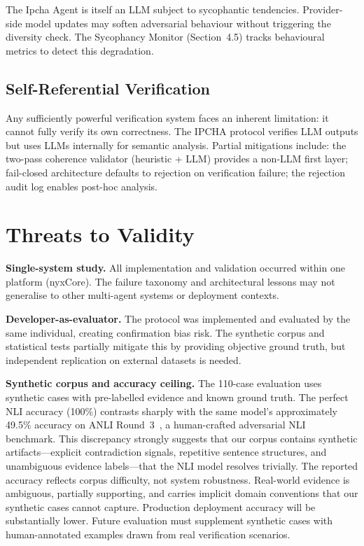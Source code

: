 \documentclass[11pt,a4paper]{article}
\begin{document}
The Ipcha Agent is itself an LLM subject to sycophantic tendencies.
Provider-side model updates may soften adversarial behaviour without
triggering the diversity check.  The Sycophancy Monitor
(Section~4.5) tracks behavioural metrics to detect this degradation.

\subsection{Self-Referential Verification}

Any sufficiently powerful verification system faces an inherent
limitation: it cannot fully verify its own correctness.  The IPCHA
protocol verifies LLM outputs but uses LLMs internally for semantic
analysis.  Partial mitigations include: the two-pass coherence
validator (heuristic + LLM) provides a non-LLM first layer;
fail-closed architecture defaults to rejection on verification
failure; the rejection audit log enables post-hoc analysis.

\section{Threats to Validity}\label{sec:threats}

\textbf{Single-system study.}  All implementation and validation
occurred within one platform (nyxCore).  The failure taxonomy and
architectural lessons may not generalise to other multi-agent systems
or deployment contexts.

\textbf{Developer-as-evaluator.}  The protocol was implemented and
evaluated by the same individual, creating confirmation bias risk.
The synthetic corpus and statistical tests partially mitigate this by
providing objective ground truth, but independent replication on
external datasets is needed.

\textbf{Synthetic corpus and accuracy ceiling.}  The 110-case
evaluation uses synthetic cases with pre-labelled evidence and known
ground truth.  The perfect NLI accuracy (100\%) contrasts sharply
with the same model's approximately 49.5\% accuracy on ANLI
Round~3~\cite{nie2020anli}, a human-crafted adversarial NLI
benchmark.  This discrepancy strongly suggests that our corpus
contains synthetic artifacts---explicit contradiction signals,
repetitive sentence structures, and unambiguous evidence labels---that
the NLI model resolves trivially.  The reported accuracy reflects
corpus difficulty, not system robustness.  Real-world evidence is
ambiguous, partially supporting, and carries implicit domain
conventions that our synthetic cases cannot capture.  Production
deployment accuracy will be substantially lower.  Future evaluation
must supplement synthetic cases with human-annotated examples drawn
from real verification scenarios.
\end{document}
